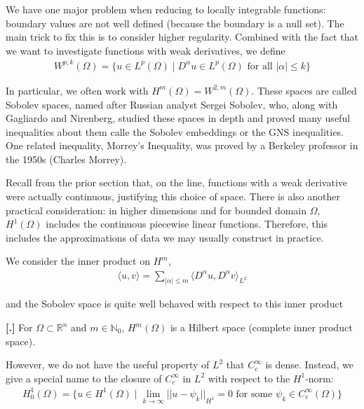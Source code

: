\documentclass{article}
\newcommand{\N}{{\mathbb{N}}}
\newcommand{\R}{{\mathbb{R}}}
\newcommand{ \norm }[1]{{ || {#1}||}}
\newcommand{\CC}{C_{c}^{\infty}}
\newcounter{result}[section]
\newenvironment{res}[1][]{\refstepcounter{result}\par\medskip
	\noindent \textbf{[\thesection.\theresult] #1} \rmfamily}{\medskip}
\begin{document}
	We have one major problem when reducing to locally integrable functions: boundary values are not well defined (because the boundary is a null set). The main trick to fix this is to consider higher regularity. Combined with the fact that we want to investigate functions with weak derivatives, we define 
	\begin{align*}
		W^{p,k}(\Omega) = \{ u \in L^p(\Omega) \mid D^{\alpha} u \in L^{p}(\Omega) \text{ for all } |\alpha| \leq k\}
	\end{align*}
	
	In particular, we often work with $H^{m}(\Omega) = W^{2,m}(\Omega)$. These spaces are called Sobolev spaces, named after Russian analyst Sergei Sobolev, who, along with Gagliardo and Nirenberg, studied these spaces in depth and proved many useful inequalities about them calle the Sobolev embeddings or the GNS inequalities. One related inequality, Morrey's Inequality, was proved by a Berkeley professor in the 1950s (Charles Morrey).
	
	Recall from the prior section that, on the line, functions with a weak derivative were actually continuous, justifying this choice of space. There is also another practical consideration: in higher dimensions and for bounded domain $\Omega$, $H^{1}(\Omega)$ includes the continuous piecewise linear functions. Therefore, this includes the approximations of data we may usually construct in practice. 
	
	We consider the inner product on $H^{m}$, 
	\begin{align*}
		\langle u,v \rangle  = \sum_{|\alpha| \leq m} \langle D^{\alpha}u,D^{\alpha} v \rangle_{L^{2}}
	\end{align*}
	
	and the Sobolev space is quite well behaved with respect to this inner product
	
	\begin{res}
		For $\Omega \subset \R^{n}$ and $m \in \N_{0}$, $H^{m}(\Omega)$ is a Hilbert space (complete inner product space). 
	\end{res}
	
	However, we do not have the useful property of $L^{2}$ that $\CC$ is dense. Instead, we give a special name to the closure of $\CC$ in $L^{2}$ with respect to the $H^{1}$-norm:
	\begin{align*}
		H^{1}_{0}(\Omega) = \{ u \in H^{1}(\Omega) \mid \lim_{k \to \infty} \norm{u-\psi_{k}}_{H^{1}} = 0 \text{ for some } \psi_{k} \in \CC(\Omega) \}
	\end{align*}
	
\end{document}

